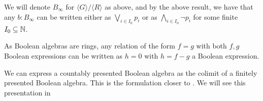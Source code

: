 \begin{remark}
  We will denote $B_\infty$ for $\langle G \rangle/ \langle R\rangle $ as above, 
  and by the above result, we have that any $b:B_\infty$ can be written 
  either as $\bigvee_{i\in I_0} p_i$ or as $\bigwedge_{i\in I_0} \neg p_i$ for some finite $I_0\subseteq \mathbb{N}$. 
\end{remark}


\begin{remark}
  As Boolean algebras are rings, any relation of the form $f=g$ with both $f,g$ Boolean expressions 
  can be written as $h=0$ with $h=f-g$ a Boolean expression. 
\end{remark} 

We can express a countably presented Boolean algebra as the colimit of a finitely presented Boolean algebra. 
This is the formulation closer to \cite{Scholze}. We will see this presentation in 



